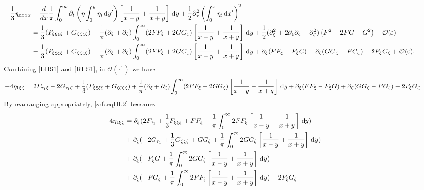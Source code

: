 \documentclass[10pt,reqno,oneside,a4paper, landscape]{article}
\begin{document}
\begin{align}
\frac{1}{3} \eta_{xxxx} &+ \frac{d}{dx} \frac{1}{\pi} \int_0^\infty \partial_t \left( \eta \int^{y}_0\eta_{t} \,\mathrm{d} y' \right) \left[ \frac{1}{x-y} + \frac{1}{x+y} \right] \,\mathrm{d} y + \frac{1}{2} \partial^2_x\left(\int^{x}_0\eta_{t} \,\mathrm{d} x' \right)^2 \nonumber\\
&= \frac{1}{3}(F_{\xi\xi\xi\xi} + G_{\zeta\zeta\zeta\zeta}) + \frac{1}{\pi} (\partial_\xi + \partial_\zeta) \int_0^\infty ( 2FF_\xi + 2GG_\zeta) \left[ \frac{1}{x-y} + \frac{1}{x+y} \right] \,\mathrm{d} y + \frac{1}{2} (\partial_\xi^2 + 2\partial_\xi \partial_\zeta + \partial_\zeta^2) \left(F^2 - 2FG + G^2 \right) + \mathcal{O}(\varepsilon) \nonumber \\
&= \frac{1}{3}(F_{\xi\xi\xi\xi} + G_{\zeta\zeta\zeta\zeta}) + \frac{1}{\pi} (\partial_\xi + \partial_\zeta) \int_0^\infty ( 2FF_\xi + 2GG_\zeta) \left[ \frac{1}{x-y} + \frac{1}{x+y} \right] \,\mathrm{d} y + \partial_{\xi}(F F_{\xi} - F_{\xi}G) + \partial_{\zeta}(G G_{\zeta} - F G_{\zeta}) - 2 F_{\xi}G_{\zeta} + \mathcal{O}(\varepsilon). \label{RHS1}
\end{align}
Combining \eqref{LHS1} and \eqref{RHS1}, in $\mathcal{O}(\epsilon^1)$ we have
\begin{equation}\label{srfceqHL2}
- 4\eta_{1\xi \zeta} = 2F_{\tau_1 \xi} - 2G_{\tau_1 \zeta} + \frac{1}{3}(F_{\xi\xi\xi\xi} + G_{\zeta\zeta\zeta\zeta}) + \frac{1}{\pi} (\partial_\xi + \partial_\zeta) \int_0^\infty ( 2FF_\xi + 2GG_\zeta) \left[ \frac{1}{x-y} + \frac{1}{x+y} \right] \,\mathrm{d} y + \partial_{\xi}(F F_{\xi} - F_{\xi}G) + \partial_{\zeta}(G G_{\zeta} - F G_{\zeta}) - 2 F_{\xi}G_{\zeta} 
\end{equation}
By rearranging appropriately, \eqref{srfceqHL2} becomes
\begin{equation}\label{srfceqHL3}
\begin{aligned}
- 4\eta_{1\xi \zeta} &= \partial_\xi (2F_{\tau_1} + \frac{1}{3}F_{\xi\xi\xi} + F F_{\xi} +  \frac{1}{\pi} \int_0^\infty 2FF_\xi \left[ \frac{1}{x-y} + \frac{1}{x+y} \right] \,\mathrm{d} y) \\
&+ \partial_\zeta(- 2G_{\tau_1} +  \frac{1}{3} G_{\zeta\zeta\zeta}+ G G_{\zeta}  + \frac{1}{\pi} \int_0^\infty 2GG_\zeta \left[ \frac{1}{x-y} + \frac{1}{x+y} \right] \,\mathrm{d} y) \\
&+ \partial_{\xi}( - F_{\xi}G + \frac{1}{\pi} \int_0^\infty 2GG_\zeta \left[ \frac{1}{x-y} + \frac{1}{x+y} \right] \,\mathrm{d} y) \\
&+ \partial_{\zeta}(- F G_{\zeta} +  \frac{1}{\pi} \int_0^\infty 2FF_\xi \left[ \frac{1}{x-y} + \frac{1}{x+y} \right] \,\mathrm{d} y) - 2 F_{\xi}G_{\zeta} 
\end{aligned}
\end{equation}
\end{document}
